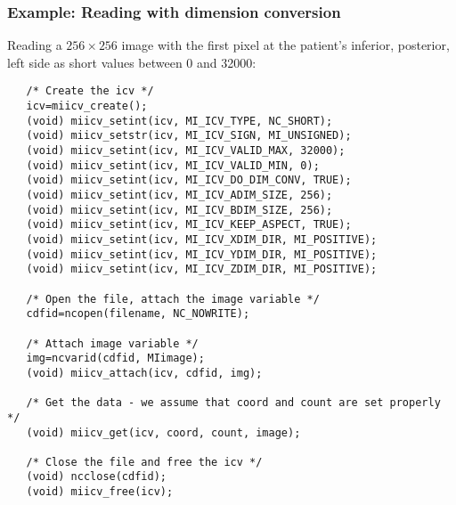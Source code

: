\subsubsection{Example: Reading with dimension conversion}

Reading a $256 \times 256$ image with the first pixel at the patient's
inferior, posterior, left side as short values between 0 and 32000:
\begin{verbatim}
   /* Create the icv */
   icv=miicv_create();
   (void) miicv_setint(icv, MI_ICV_TYPE, NC_SHORT);
   (void) miicv_setstr(icv, MI_ICV_SIGN, MI_UNSIGNED);
   (void) miicv_setint(icv, MI_ICV_VALID_MAX, 32000);
   (void) miicv_setint(icv, MI_ICV_VALID_MIN, 0);
   (void) miicv_setint(icv, MI_ICV_DO_DIM_CONV, TRUE);
   (void) miicv_setint(icv, MI_ICV_ADIM_SIZE, 256);
   (void) miicv_setint(icv, MI_ICV_BDIM_SIZE, 256);
   (void) miicv_setint(icv, MI_ICV_KEEP_ASPECT, TRUE);
   (void) miicv_setint(icv, MI_ICV_XDIM_DIR, MI_POSITIVE);
   (void) miicv_setint(icv, MI_ICV_YDIM_DIR, MI_POSITIVE);
   (void) miicv_setint(icv, MI_ICV_ZDIM_DIR, MI_POSITIVE);

   /* Open the file, attach the image variable */
   cdfid=ncopen(filename, NC_NOWRITE);

   /* Attach image variable */
   img=ncvarid(cdfid, MIimage);
   (void) miicv_attach(icv, cdfid, img);

   /* Get the data - we assume that coord and count are set properly */
   (void) miicv_get(icv, coord, count, image);

   /* Close the file and free the icv */
   (void) ncclose(cdfid);
   (void) miicv_free(icv);
\end{verbatim}




